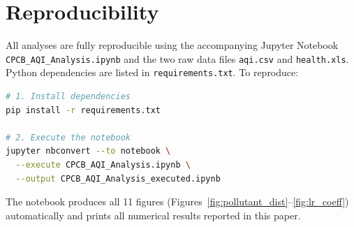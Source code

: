 \documentclass[10pt, conference]{IEEEtran}
\begin{document}
\section{Reproducibility}
\label{app:repro}

All analyses are fully reproducible using the accompanying
Jupyter Notebook \texttt{CPCB\_AQI\_Analysis.ipynb} and the
two raw data files \texttt{aqi.csv} and \texttt{health.xls}.
Python dependencies are listed in \texttt{requirements.txt}.
To reproduce:

\begin{lstlisting}[language=bash, caption={Reproducing the analysis}]
# 1. Install dependencies
pip install -r requirements.txt

# 2. Execute the notebook
jupyter nbconvert --to notebook \
  --execute CPCB_AQI_Analysis.ipynb \
  --output CPCB_AQI_Analysis_executed.ipynb
\end{lstlisting}

\noindent The notebook produces all 11 figures
(Figures~\ref{fig:pollutant_dist}--\ref{fig:lr_coeff})
automatically and prints all numerical results reported in
this paper.
\end{document}
